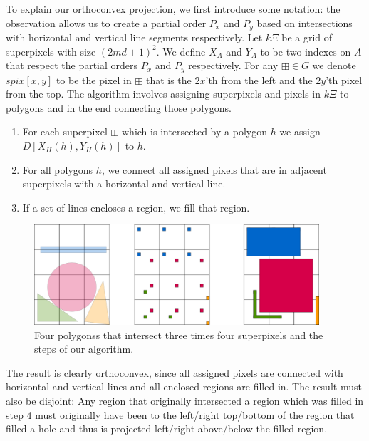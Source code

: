 \documentclass[a4paper, UKenglish]{lipics-v2018}
\newcommand{\spix}{\boxplus}
\begin{document}
To explain our orthoconvex projection, we first introduce some notation: the observation allows us to create a partial order $P_x$ and $P_y$ based on intersections with horizontal and vertical line segments respectively. Let $k\Xi$ be a grid of superpixels with size $(2md+1)^2$. We define $X_A$ and $Y_A$ to be two indexes on $A$ that respect the partial orders $P_x$ and $P_y$ respectively. For any $\spix \in G$ we denote $spix[x,y]$ to be the pixel in $\spix$ that is the $2x$'th from the left and the $2y$'th pixel from the top. The algorithm involves assigning superpixels and pixels in $k\Xi$ to polygons and in the end connecting those polygons.

\begin{enumerate}
\item For each superpixel $\spix$ which is intersected by a polygon $h$ we assign $D[X_H(h), Y_H(h)]$ to $h$.
\item For all polygons $h$, we connect all assigned pixels that are in adjacent superpixels with a horizontal and vertical line. 
\item If a set of lines encloses a region, we fill that region.
\end{enumerate}


\begin{figure}[H]
\centering
\includegraphics[width=400px]{Figures/convexprojection.png}
\caption{Four polygonss that intersect three times four superpixels and the steps of our algorithm.}
\label{fig:convexprojection}
\end{figure}

The result is clearly orthoconvex, since all assigned pixels are connected with horizontal and vertical lines and all enclosed regions are filled in. The result must also be disjoint: Any region that originally intersected a region which was filled in step 4 must originally have been to the left/right top/bottom of the region that filled a hole and thus is projected left/right above/below the filled region.
\end{document}
